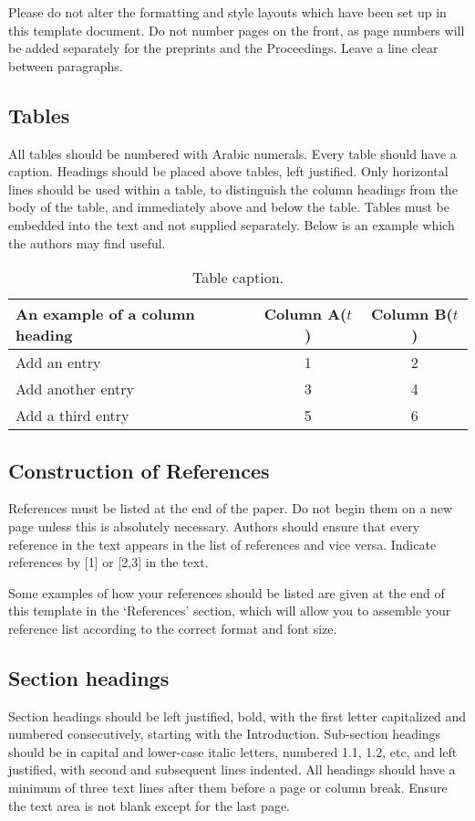 \documentclass[10pt]{article}
\begin{document}
Please do not alter the formatting and style layouts which have been set up in this template document. Do not number pages on the front, as page numbers will be added separately for the preprints and the Proceedings. Leave a line clear between paragraphs. 


\subsection{Tables}
All tables should be numbered with Arabic numerals. Every table should have a caption. Headings should be placed above tables, left justified. Only horizontal lines should be used within a table, to distinguish the column headings from the body of the table, and immediately above and below the table. Tables must be embedded into the text and not supplied separately. Below is an example which the authors may find useful.

\begin{table}[h]
\caption{Table caption.}
\centering
\begin{tabular}{lcc}
\hline
An example of a column heading & Column A($t$) & Column B($t$) \\ \hline
Add an entry & 1 & 2 \\ 
Add another entry & 3 & 4 \\
Add a third entry & 5 & 6 \\ \hline
\end{tabular}
\end{table}


\subsection{Construction of References}
References must be listed at the end of the paper. Do not begin them on a new page unless this is absolutely necessary. Authors should ensure that every reference in the text appears in the list of references and vice versa. Indicate references by [1] or [2,3] in the text. 

Some examples of how your references should be listed are given at the end of this template in the `References' section, which will allow you to assemble your reference list according to the correct format and font size.


\subsection{Section headings}
Section headings should be left justified, bold, with the first letter capitalized and numbered consecutively, starting with the Introduction. Sub-section headings should be in capital and lower-case italic letters, numbered 1.1, 1.2, etc, and left justified, with second and subsequent lines indented. All headings should have a minimum of three text lines after them before a page or column break. Ensure the text area is not blank except for the last page.
\end{document}
